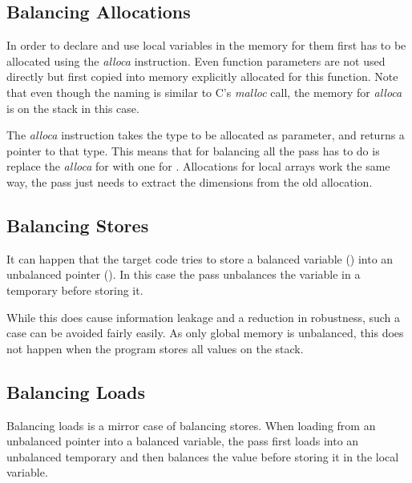 \subsection{Balancing Allocations}
In order to declare and use local variables in \ir{} the memory for them first has to be allocated using the \emph{alloca} instruction.
Even function parameters are not used directly but first copied into memory explicitly allocated for this function.
Note that even though the naming is similar to C's \emph{malloc} call, the memory for \emph{alloca} is on the stack in this case.

The \emph{alloca} instruction takes the type to be allocated as parameter, and returns a pointer to that type.
This means that for balancing all the pass has to do is replace the \emph{alloca} for  with one for .
Allocations for local arrays work the same way, the pass just needs to extract the dimensions from the old allocation.

\subsection{Balancing Stores}
It can happen that the target code tries to store a balanced variable () into an unbalanced pointer ().
In this case the pass unbalances the variable in a temporary before storing it.

While this does cause information leakage and a reduction in robustness, such a case can be avoided fairly easily.
As only global memory is unbalanced, this does not happen when the program stores all values on the stack.

\subsection{Balancing Loads}
Balancing loads is a mirror case of balancing stores.
When loading from an unbalanced pointer into a balanced variable, the pass first loads into an unbalanced temporary and then balances the value before storing it in the local variable.


